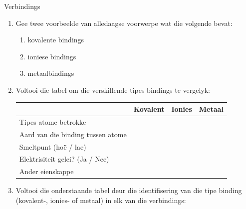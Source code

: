             \begin{exercises}{Verbindings}
            \nopagebreak
        \label{m38694*id143111}\begin{enumerate}[noitemsep, label=\textbf{\arabic*}. ] 
            \label{m38694*uid86}\item Gee twee voorbeelde van alledaagse voorwerpe wat die volgende bevat:
\label{m38694*id143127}\begin{enumerate}[noitemsep, label=\textbf{\alph*}. ] 
            \label{m38694*uid87}\item kovalente bindings
\label{m38694*uid88}\item ioniese bindings
\label{m38694*uid89}\item metaalbindings
\end{enumerate}
                \label{m38694*uid90}\item Voltooi die tabel om die verskillende tipes bindings te vergelyk:
          \begin{table}[H]
        \begin{center}
      \label{m38694*id143180}
    \noindent
      \begin{tabular}{|l|l|l|l|}\hline
         &
        \textbf{Kovalent} &
        \textbf{Ionies} &
        \textbf{Metaal} \\ \hline
        Tipes atome betrokke &
         &
         &
        \\ \hline
        Aard van die binding tussen atome &
         &
         &
       \\ \hline
        Smeltpunt (ho\"{e} / lae) &
         &
         &
       \\ \hline
        Elektrisiteit gelei? (Ja / Nee) &
         &
         &
      \\ \hline
        Ander eienskappe &
         &
         &
       \\ \hline
    \end{tabular}
      \end{center}
\end{table}
    \par
          \label{m38694*uid91}\item Voltooi die onderstaande tabel deur die identifisering van die tipe binding (kovalent-,  ionies- of  metaal) in elk van die verbindings:

\end{enumerate}
\end{exercises}
